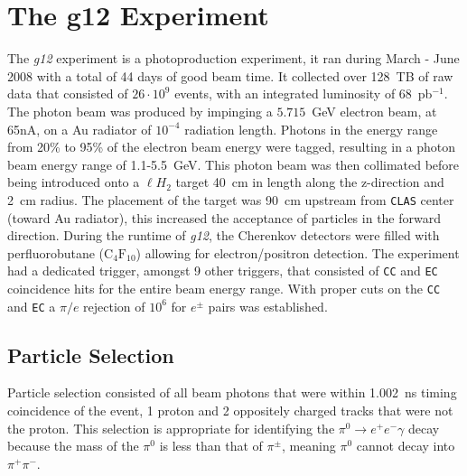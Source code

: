 \documentclass{aip-cp}
\def\g12{\emph{g12}}
\newcommand{\abbr}[1]{\textsc{\texttt{#1}}}
\begin{document}
\section{The g12 Experiment}
The \g12 experiment is a photoproduction experiment, it ran during March - June 2008 with a total of 44 days of good beam time. It collected over 128~TB of raw data that consisted of $26\cdot 10^9$ events, with an integrated luminosity of 68~pb$^{-1}$. The photon beam was produced by impinging a $5.715$~GeV electron beam, at 65nA, on a Au radiator of $10^{-4}$ radiation length. Photons in the energy range from 20\% to 95\% of the electron beam
energy were tagged, resulting in a photon beam energy range of 1.1-5.5~GeV. This photon beam was then collimated before being introduced onto a $\ell H_2$ target 40~cm in length along the z-direction and 2~cm radius. The placement of the target was 90~cm upstream from \abbr{CLAS} center (toward Au radiator), this increased the acceptance of particles in the forward direction. During the runtime of \g12, the Cherenkov detectors were filled with perfluorobutane ($\mathrm{C_4F_{10}}$) allowing for electron/positron detection. The experiment had a dedicated trigger, amongst 9 other triggers, that consisted of \abbr{CC} and \abbr{EC} coincidence hits for the entire beam energy range. With proper cuts on the \abbr{CC} and \abbr{EC} a $\pi/e$ rejection of $10^6$ for $e^{\pm}$ pairs was established.
\subsection{Particle Selection}
Particle selection consisted of all beam photons that were within 1.002~ns timing coincidence of the event, 1 proton and 2 oppositely charged tracks that were not the proton. This selection is appropriate for identifying the $\pi^0 \to e^+e^-\gamma$ decay because the mass of the $\pi^0$ is less than that of $\pi^{\pm}$, meaning $\pi^0$ cannot decay into $\pi^{+}\pi^{-}$.
\end{document}
